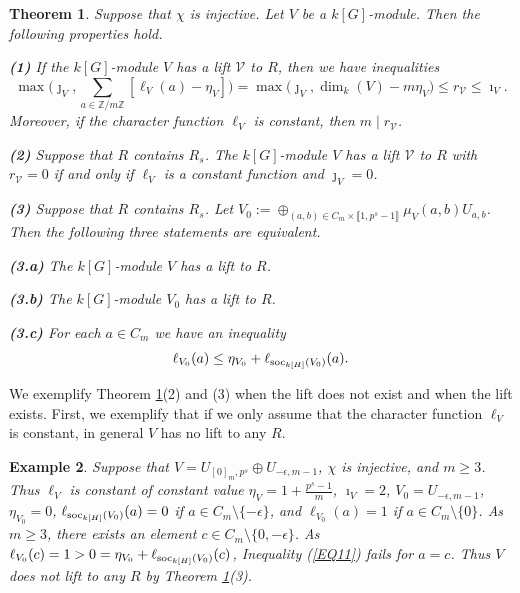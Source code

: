 \documentclass[11pt]{amsart}
\newtheorem{theorem}{Theorem}[section]
\newtheorem{ex}[theorem]{Example}
\def\soc{\textup{soc}}
\begin{document}
\begin{theorem}\label{T2}
Suppose that $\chi$ is injective. Let $V$ be a $k[G]$-module. Then the following properties hold. 

\medskip
{\bf (1)} If the $k[G]$-module $V$ has a lift $\mathcal V$ to $R$, then we have inequalities
$$\max\bigl(\jmath_V,\sum_{a\in\mathbb Z/m\mathbb Z} [\ell_V(a)-\eta_V]\bigl)=\max\bigl(\jmath_V,\dim_k(V)-m\eta_V\bigr)\le r_{\mathcal V}\le\imath_V.$$
Moreover, if the character function $\ell_V$ is constant, then $m\mid r_{\mathcal V}$.

\smallskip
{\bf (2)} Suppose that $R$ contains $R_s$. The $k[G]$-module $V$ has a lift $\mathcal V$ to $R$ with $r_{\mathcal V}=0$ if and only if $\ell_V$ is a constant function and $\jmath_V=0$.

\smallskip
{\bf (3)} Suppose that $R$ contains $R_s$. Let $V_0:=\oplus_{(a,b)\in C_m\times\llbracket1,p^s-1\rrbracket} \mu_V(a,b)U_{a,b}$. Then the following three statements are equivalent.

\medskip\noindent
{\bf (3.a)} The $k[G]$-module $V$ has a lift to $R$.

\smallskip\noindent
{\bf (3.b)} The $k[G]$-module $V_0$ has a lift to $R$.

\smallskip\noindent
{\bf (3.c)} For each $a\in C_m$ we have an inequality 
\begin{equation}\label{EQ11}
\ell_{V_0}(a)\le \eta_{V_0}+\ell_{\soc_{k[H]}(V_0)}(a).
\end{equation}
\end{theorem}

We exemplify Theorem \ref{T2}(2) and (3) when the lift does not exist and when the lift exists. First, we exemplify that if we only assume that the character function $\ell_V$ is constant, in general $V$ has no lift to any $R$. 

\begin{ex}\normalfont\label{EX2}
Suppose that $V=U_{[0]_m,p^s}\oplus U_{-\epsilon,m-1}$, $\chi$ is injective, and $m\ge 3$. Thus $\ell_V$ is constant of constant value $\eta_V=1+\frac{p^s-1}{m}$, $\imath_V=2$, $V_0=U_{-\epsilon,m-1}$, $\eta_{V_0}=0$, $\ell_{\soc_{k[H]}(V_0)}(a)=0$ if $a\in C_m\setminus\{-\epsilon\}$, and $\ell_{V_0}(a)=1$ if $a\in C_m\setminus\{0\}$. As $m\ge 3$, there exists an element $c\in C_m\setminus\{0,-\epsilon\}$. As $\ell_{V_0}(c)=1>0=\eta_{V_0}+\ell_{\soc_{k[H]}(V_0)}(c)$, Inequality (\ref{EQ11}) fails for $a=c$. Thus $V$ does not lift to any $R$ by Theorem \ref{T2}(3).
\end{ex}
\end{document}
